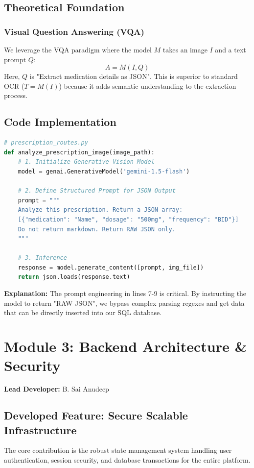 \documentclass[a4paper,12pt]{report}
\begin{document}
\section{Theoretical Foundation}
\subsection{Visual Question Answering (VQA)}
We leverage the VQA paradigm where the model $M$ takes an image $I$ and a text prompt $Q$:
$$ A = M(I, Q) $$
Here, $Q$ is "Extract medication details as JSON". This is superior to standard OCR ($T = M(I)$) because it adds semantic understanding to the extraction process.

\section{Code Implementation}
\begin{lstlisting}[language=Python, caption=Gemini Vision Integration]
# prescription_routes.py
def analyze_prescription_image(image_path):
    # 1. Initialize Generative Vision Model
    model = genai.GenerativeModel('gemini-1.5-flash')
    
    # 2. Define Structured Prompt for JSON Output
    prompt = """
    Analyze this prescription. Return a JSON array:
    [{"medication": "Name", "dosage": "500mg", "frequency": "BID"}]
    Do not return markdown. Return RAW JSON only.
    """
    
    # 3. Inference
    response = model.generate_content([prompt, img_file])
    return json.loads(response.text)
\end{lstlisting}
\textbf{Explanation:} The prompt engineering in lines 7-9 is critical. By instructing the model to return "RAW JSON", we bypass complex parsing regexes and get data that can be directly inserted into our SQL database.

\newpage

\chapter{Module 3: Backend Architecture \& Security}
\textbf{Lead Developer:} B. Sai Anudeep

\section{Developed Feature: Secure Scalable Infrastructure}
The core contribution is the robust state management system handling user authentication, session security, and database transactions for the entire platform.
\end{document}

